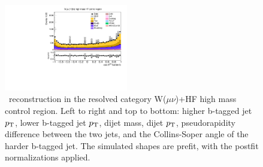 \begin{figure}[tbp]
\begin{center}
    \includegraphics[width=0.48\textwidth]{figures/wlnhbb2016/resolved/WmnWHHeavyFlavorCRHighMass_hbbCosThetaCSJ1.pdf}
    \caption{\HBB\ reconstruction in the resolved category W($\mu\nu$)+HF high mass control region.
    Left to right and top to bottom: higher b-tagged jet $p_{\mathrm{T}}$, lower b-tagged jet $p_{\mathrm{T}}$, dijet mass, dijet $p_{\mathrm{T}}$, 
    pseudorapidity difference between the two jets, and the Collins-Soper angle of the harder b-tagged jet.
    The simulated shapes are prefit, with the postfit normalizations applied.}
    \label{fig:res_WmnHFHighMass_Hbb}
  \end{center}
\end{figure}
\clearpage

